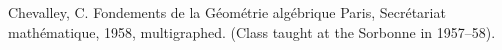 \documentclass{article}
\begin{document}

\nocite{*}

\begin{thebibliography}{1}

  {\sc Chevalley, C.}
  \newblock Fondements de la G\'{e}om\'{e}trie alg\'{e}brique
  \newblock Paris, Secr\'{e}tariat math\'{e}matique, 1958, multigraphed.
  \newblock (Class taught at the Sorbonne in 1957--58).

\end{thebibliography}
\end{document}
